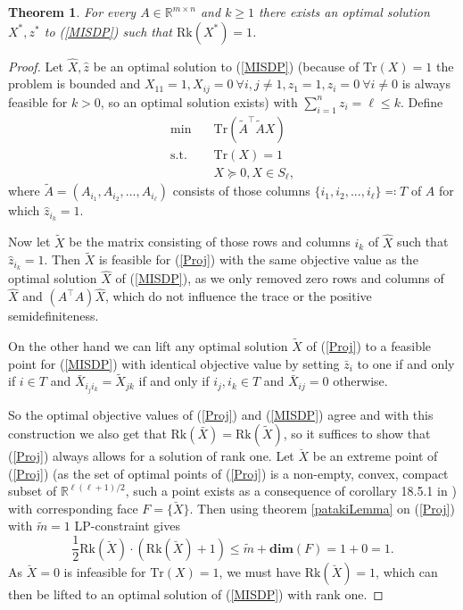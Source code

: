 \documentclass[a4paper,11pt,1p]{elsarticle}
\newtheorem{thm}{Theorem}
\newcommand{\enifed}{\eqqcolon}
\newcommand{\T}{^{\top}}
\newcommand{\Tr}{\text{Tr}}
\newcommand{\Rk}{\text{Rk}}
\newcommand{\R}{\mathds{R}}
\begin{document}
\begin{thm}\label{Rk1thm}
 For every $A \in \R^{m \times n}$ and $k \geq 1$ there exists an optimal solution $X^*, z^*$ to (\ref{MISDP}) such that $\Rk(X^*) = 1$. 
\end{thm}
\begin{proof}
 Let $\hat{X}, \hat{z}$ be an optimal solution to (\ref{MISDP}) (because of $\Tr(X) = 1$ the problem is bounded and $X_{11} = 1, X_{ij} = 0 \ \forall i,j \neq 1, z_1 = 1, z_i = 0 \ \forall i \neq 0$ is always feasible for $k > 0$,
 so an optimal solution exists)
 with $\sum_{i=1}^n z_i = \ell \leq k$. Define
 \begin{align}\label{Proj}
 \min \quad & \Tr(\tilde{A}\T\tilde{A}X) \nonumber \\
 \text{s.t.} \quad & \Tr(X) = 1 \tag{Proj} \\
 & X \succeq 0 , X \in S_\ell, \nonumber
 \end{align}
where $\tilde{A} = (A_{i_1}, A_{i_2}, ..., A_{i_\ell})$ consists of those
columns $\{{i_1}, {i_2}, ..., {i_\ell}\} \enifed T$ of $A$ for which
$\hat{z}_{i_k} = 1$.

Now let $\tilde{X}$ be the matrix consisting of those rows and columns 
$i_k$ of $\hat{X}$ such that $\hat{z}_{i_k} = 1$. Then $\tilde{X}$ is feasible for (\ref{Proj}) with the same objective value as the optimal solution $\hat{X}$ of (\ref{MISDP}), as we only removed zero rows and columns of $\hat{X}$ 
and $(A\T A)\hat{X}$, which do not influence the trace or the positive
semidefiniteness.

On the other hand we can lift any optimal solution $\tilde{X}$ of (\ref{Proj}) to a feasible point for (\ref{MISDP}) with identical objective value by setting $\bar{z}_i$ to one if and only if $i \in T$
and $\bar{X}_{i_j i_k} = \tilde{X}_{jk}$ if and only if $i_j, i_k \in T$
and $\bar{X}_{ij}=0$ otherwise.

So the optimal objective values of (\ref{Proj}) and (\ref{MISDP}) agree and with this construction we also get that 
$\Rk(\bar{X}) = \Rk(\tilde{X})$, so it suffices to show that (\ref{Proj}) always allows for a solution of rank one.
Let $\breve{X}$ be an extreme point of (\ref{Proj}) (as the set of optimal points of (\ref{Proj}) is a non-empty, convex, compact subset of $\R^{\ell(\ell+1)/2}$, such a point exists as a consequence of corollary 18.5.1 in
\cite{Roc70}) with corresponding face $F=\{\breve{X}\}$. Then using theorem \ref{patakiLemma} on (\ref{Proj}) with $\tilde{m} = 1$ LP-constraint gives
\begin{equation*}
 \frac{1}{2}\Rk(\breve{X})\cdot(\Rk(\breve{X})+1) \leq \tilde{m} + \textbf{dim}(F) = 1 + 0 = 1.
\end{equation*}
As $\breve{X}=0$ is infeasible for $\Tr(X)=1$, we must have $\Rk(\breve{X}) = 1$, which can then be lifted to an optimal solution of (\ref{MISDP}) with rank one.
\end{proof}
\end{document}
